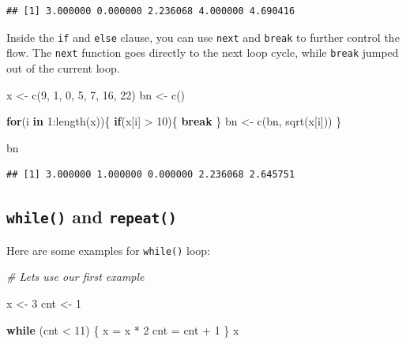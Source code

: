 \documentclass[
]{book}
\newenvironment{Shaded}{\begin{snugshade}}{\end{snugshade}}
\newcommand{\CommentTok}[1]{\textcolor[rgb]{0.56,0.35,0.01}{\textit{#1}}}
\newcommand{\ControlFlowTok}[1]{\textcolor[rgb]{0.13,0.29,0.53}{\textbf{#1}}}
\newcommand{\DecValTok}[1]{\textcolor[rgb]{0.00,0.00,0.81}{#1}}
\newcommand{\FunctionTok}[1]{\textcolor[rgb]{0.00,0.00,0.00}{#1}}
\newcommand{\NormalTok}[1]{#1}
\newcommand{\OtherTok}[1]{\textcolor[rgb]{0.56,0.35,0.01}{#1}}
\newcommand{\SpecialCharTok}[1]{\textcolor[rgb]{0.00,0.00,0.00}{#1}}
\theoremstyle{definition}
\theoremstyle{definition}
\theoremstyle{definition}
\theoremstyle{definition}
\theoremstyle{remark}
\begin{document}
\begin{verbatim}
## [1] 3.000000 0.000000 2.236068 4.000000 4.690416
\end{verbatim}

Inside the \texttt{if} and \texttt{else} clause, you can use \texttt{next} and \texttt{break} to further control the flow. The \texttt{next} function goes directly to the next loop cycle, while \texttt{break} jumped out of the current loop.

\begin{Shaded}
\begin{Highlighting}[]
\NormalTok{x }\OtherTok{\textless{}{-}} \FunctionTok{c}\NormalTok{(}\DecValTok{9}\NormalTok{, }\DecValTok{1}\NormalTok{, }\DecValTok{0}\NormalTok{, }\DecValTok{5}\NormalTok{, }\DecValTok{7}\NormalTok{, }\DecValTok{16}\NormalTok{, }\DecValTok{22}\NormalTok{)}
\NormalTok{bn }\OtherTok{\textless{}{-}} \FunctionTok{c}\NormalTok{()}

\ControlFlowTok{for}\NormalTok{(i }\ControlFlowTok{in} \DecValTok{1}\SpecialCharTok{:}\FunctionTok{length}\NormalTok{(x))\{ }
  \ControlFlowTok{if}\NormalTok{(x[i] }\SpecialCharTok{\textgreater{}} \DecValTok{10}\NormalTok{)\{ }
    \ControlFlowTok{break}
\NormalTok{  \} }
\NormalTok{  bn }\OtherTok{\textless{}{-}} \FunctionTok{c}\NormalTok{(bn,  }\FunctionTok{sqrt}\NormalTok{(x[i]))}
\NormalTok{\}}

\NormalTok{bn}
\end{Highlighting}
\end{Shaded}

\begin{verbatim}
## [1] 3.000000 1.000000 0.000000 2.236068 2.645751
\end{verbatim}

\hypertarget{while-and-repeat}{%
\subsection{\texorpdfstring{\texttt{while()} and \texttt{repeat()}}{while() and repeat()}}\label{while-and-repeat}}

Here are some examples for \texttt{while()} loop:

\begin{Shaded}
\begin{Highlighting}[]
\CommentTok{\# Let\textquotesingle{}s use our first example}

\NormalTok{x }\OtherTok{\textless{}{-}} \DecValTok{3}
\NormalTok{cnt }\OtherTok{\textless{}{-}} \DecValTok{1}

\ControlFlowTok{while}\NormalTok{ (cnt }\SpecialCharTok{\textless{}} \DecValTok{11}\NormalTok{) \{}
\NormalTok{   x }\OtherTok{=}\NormalTok{ x }\SpecialCharTok{*} \DecValTok{2}
\NormalTok{   cnt }\OtherTok{=}\NormalTok{ cnt }\SpecialCharTok{+} \DecValTok{1}
\NormalTok{\}}
\NormalTok{x}
\end{Highlighting}
\end{Shaded}
\end{document}
